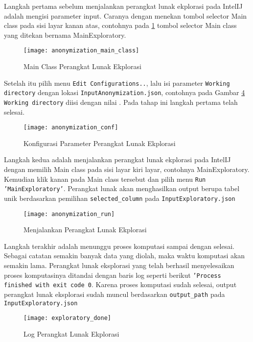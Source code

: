 Langkah pertama sebelum menjalankan perangkat lunak ekplorasi pada IntelIJ adalah mengisi parameter input. Caranya dengan menekan tombol selector Main class pada sisi layar kanan atas, contohnya pada \ref{fig:pertama1} tombol selector Main class yang ditekan bernama MainExploratory. 

\begin{figure}[H]
	\centering
	\texttt{[image: anonymization\_main\_class]}
	\caption{Main Class Perangkat Lunak Ekplorasi}
	\label{fig:pertama1}
\end{figure}

\newpage
Setelah itu pilih menu \texttt{Edit Configurations..}, lalu isi parameter \texttt{Working directory} dengan lokasi \texttt{InputAnonymization.json}, contohnya pada Gambar \ref{fig:pertama2} \texttt{Working directory} diisi dengan nilai . Pada tahap ini langkah pertama telah selesai.

\begin{figure}[H]
	\centering
	\texttt{[image: anonymization\_conf]}
	\caption{Konfigurasi Parameter Perangkat Lunak Ekplorasi}
	\label{fig:pertama2}
\end{figure}

Langkah kedua adalah menjalankan perangkat lunak ekplorasi pada IntelIJ dengan memilih Main class pada sisi layar kiri layar, contohnya MainExploratory. Kemudian klik kanan pada Main class tersebut dan pilih menu \texttt{Run 'MainExploratory'}. Perangkat lunak akan menghasilkan output berupa tabel unik berdasarkan pemilihan \texttt{selected\_column} pada \texttt{InputExploratory.json}

\begin{figure}[H]
	\centering
	\texttt{[image: anonymization\_run]}
	\caption{Menjalankan Perangkat Lunak Ekplorasi}
	\label{fig:pertama2}
\end{figure}

\newpage
Langkah terakhir adalah menunggu proses komputasi sampai dengan selesai. Sebagai catatan semakin banyak data yang diolah, maka waktu komputasi akan semakin lama. Perangkat lunak eksplorasi yang telah berhasil menyelesaikan proses komputasinya ditandai dengan baris log seperti berikut \texttt{'Process finished with exit code 0}. Karena proses komputasi sudah selesai, output perangkat lunak eksplorasi sudah muncul berdasarkan \texttt{output\_path} pada \texttt{InputExploratory.json}

\begin{figure}[H]
	\centering
	\texttt{[image: exploratory\_done]}
	\caption{Log Perangkat Lunak Ekplorasi}
	\label{fig:pertama2}
\end{figure}

